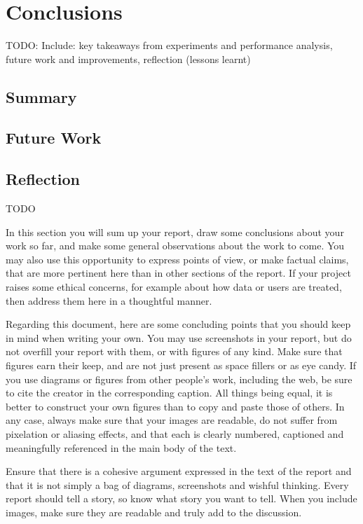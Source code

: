 \chapter{Conclusions}

TODO: Include: key takeaways from experiments and performance analysis, future work and improvements, reflection (lessons learnt)

\section{Summary}


\section{Future Work}


\section{Reflection}

TODO

In this section you will sum up your report, draw some conclusions about your work so far, and make some
general observations about the work to come. You may also use this opportunity to express points of view,
or make factual claims, that are more pertinent here than in other sections of the report. If your project
raises some ethical concerns, for example about how data or users are treated, then address them here in a
thoughtful manner.

Regarding this document, here are some concluding points that you should keep in mind when writing your own.
You may use screenshots in your report, but do not overfill your report with them, or with figures of any kind.
Make sure that figures earn their keep, and are not just present as space fillers or as eye candy. If you use
diagrams or figures from other people's work, including the web, be sure to cite the creator in the corresponding
caption. All things being equal, it is better to construct your own figures than to copy and paste those of others.
In any case, always make sure that your images are readable, do not suffer from pixelation or aliasing effects,
and that each is clearly numbered, captioned and meaningfully referenced in the main body of the text.

Ensure that there is a cohesive argument expressed in the text of the report and that it is not simply a bag of
diagrams, screenshots and wishful thinking. Every report should tell a story, so know what story you want to tell.
When you include images, make sure they are readable and truly add to the discussion.

